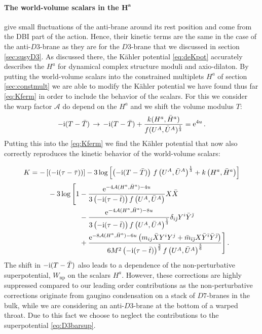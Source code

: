 \documentclass[a4paper,12pt]{report}
\newcommand{\be}{\begin{equation}}
\newcommand{\ee}{\end{equation}}
\newcommand{\bea}{\begin{equation}\begin{aligned}}
\newcommand{\eea}{\end{aligned}\end{equation}}
\def\rmi{{\rm i}}
\def\rme{{\rm e}}
\def\ib{{\bar \imath}}
\def\jb{{\bar \jmath}}
\begin{document}
\paragraph{The world-volume scalars in the $\mathbf{H^a}$} give small fluctuations of the anti-brane around its rest position and come from the DBI part of the action. Hence, their kinetic terms are the same in the case of the anti-$D3$-brane as they are for the $D3$-brane that we discussed in section \ref{sec:susyD3}. As discussed there, the Kähler potential \eqref{eq:deKpot} accurately describes the $H^a$ for dynamical complex structure moduli and axio-dilaton. By putting the world-volume scalars into the constrained multiplets $H^a$ of section \ref{sec:constmult} we are able to modify the Kähler potential we have found thus far \eqref{eq:Kferm} in order to include the behavior of the scalars. For this we consider the warp factor $\mathcal{A}$ do depend on the $H^a$ and we shift the volume modulus $T$:
\be 
-\rmi (T-\bar{T}) \,\to \, -\rmi(T-\bar{{T}}) + \frac{k(H^a,\bar{H}^a)}{f(U^A,\bar{U}^A)^{\frac{1}{3}}}=\rme^{4u}\,.
\ee
Putting this into the \eqref{eq:Kferm} we find the Kähler potential that now also correctly reproduces the kinetic behavior of the world-volume scalars:

\[
K = -\left[\left(-\rmi(\tau-\bar{\tau})\right)\right]-3 \log \left[\left(-\rmi(T-\bar{T})\right)\,f\left(U^A,\bar{U}^A\right)^{\frac{1}{3}}+k\left(H^a,\bar{H}^a\right)\right]
\]
\bea 
\qquad&- 3 \log\Bigg[1-\frac{\rme^{-4\mathcal{A}(H^a,\bar{H}^a)-4u}}{3\left(-\rmi(\tau-\bar{t})\right)f\left(U^A,\bar{U}^A\right)}X\bar{X}\\
&\qquad\qquad\;\,-\frac{\rme^{-4\mathcal{A}(H^a,\bar{H}^a)-8u}}{3\left(-\rmi(\tau-\bar{t})\right)f\left(U^A,\bar{U}^A\right)^{\frac{1}{3}}}\delta_{i\jb}Y^i\bar{Y}^\jb\\
&\qquad\qquad\;\,+\frac{\rme^{-8\mathcal{A}(H^a,\bar{H}^a)-6u}\left(m_{ij}\bar{X}Y^iY^j+\bar{m}_{\ib\jb}X \bar{Y}^\ib\bar{Y}^\jb\right)}{6 M^2 \left(-\rmi(\tau-\bar{t})\right)^{\frac{3}{2}}f\left(U^A,\bar{U}^A\right)^{\frac{5}{6}}}\Bigg]\,.
\label{eq:KpotbarD3}
\eea
The shift in $-\rmi (T-\bar{T})$ also leads to a dependence of the non-perturbative superpotential, $W_{\text{np}}$ on the scalars $H^a$. However, these corrections are highly suppressed compared to our leading order contributions as the non-perturbative corrections originate from gaugino condensation on a stack of $D7$-branes in the bulk, while we are considering an anti-$D3$-brane at the bottom of a warped throat. Due to this fact we choose to neglect the contributions to the superpotential \eqref{eq:D3barsup}.
\end{document}
